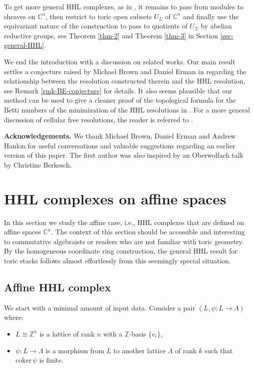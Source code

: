 \documentclass[11pt,reqno]{amsart}
\def\C {{\mathbb C}}
\def\R {{\mathbb R}}
\def\Z {{\mathbb Z}}
\theoremstyle{definition}
\numberwithin{equation}{section}
\begin{document}
\smallskip
To get more general HHL complexes, as in \cite{HHL}, it remains to pass from modules to sheaves on $\C^n$, then restrict to toric open subsets $U_\Sigma$ of $\C^n$ and finally use the equivariant nature of the construction to pass to quotients of $U_\Sigma$ by abelian reductive groups, see Theorem \ref{thm-2} and Theorem  \ref{thm-3} in Section \ref{sec-general-HHL}.

\smallskip

We end the introduction with a discussion on related works. Our main result settles a conjecture raised by Michael Brown and Daniel Erman in \cite{BE} regarding the relationship between the resolution constructed therein and the HHL resolution, see Remark \ref{rmk-BE-conjecture} for details. It also seems plausible that our method can be used to give a cleaner proof of the topological formula for the Betti numbers of the minimization of the HHL resolutions in \cite{FS}. For a more general discussion of cellular free resolutions, the reader is referred to \cite{BCHSY}.

\smallskip

{\bf Acknowledgements.} We thank Michael Brown, Daniel Erman and Andrew Hanlon for useful conversations and valuable suggestions regarding an earlier version of this paper. The first author was also inspired by an Oberwolfach talk by Christine Berkesch.


\section{HHL complexes on affine spaces}\label{sec-affine-HHL}

In this section we study the affine case, i.e., HHL complexes that are defined on affine spaces $\C^n$. The context of this section should be accessible and interesting to commutative algebraists or readers who are not familiar with toric geometry. By the homogeneous coordinate ring construction, the general HHL result for toric stacks follows almost effortlessly from this seemingly special situation.

\subsection{Affine HHL complex}\label{subsec-affine-HHL}

We start with a minimal amount of input data. Consider a pair $(L,\psi:L\rightarrow\Lambda)$ where:
\begin{itemize}
    \item $L\cong \Z^n$ is a lattice of rank $n$ with a $\Z$-basis $\{v_i\}$,
    \item $\psi:L\rightarrow\Lambda$ is a morphism from $L$ to another lattice $\Lambda$ of rank $k$ such that $\mathrm{coker}\,\psi$ is finite.
\end{itemize}
\end{document}
